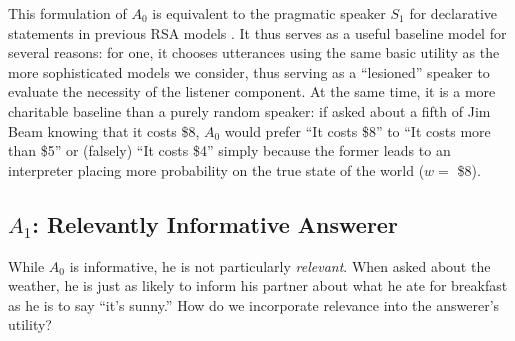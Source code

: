 \documentclass[12pt, floatsintext, jou]{apa6}
\begin{document}
This formulation of $A_0$ is equivalent to the pragmatic speaker $S_1$ for declarative statements in previous RSA models \cite{GoodmanFrank16_RSATiCS}. It thus serves as a useful baseline model for several reasons: for one, it chooses utterances using the same basic utility as the more sophisticated models we consider, thus serving as a ``lesioned'' speaker to evaluate the necessity of the listener component. At the same time, it is a more charitable baseline than a purely random speaker: if asked about a fifth of Jim Beam knowing that it costs \$8, $A_0$ would prefer ``It costs \$8'' to ``It costs more than \$5'' or (falsely) ``It costs \$4'' simply because the former leads to an interpreter placing more probability on the true state of the world ($w = $ \$8).


\subsection{$A_1$: Relevantly Informative Answerer}

While $A_0$ is informative, he is not particularly \emph{relevant}. When asked about the weather, he is just as likely to inform his partner about what he ate for breakfast as he is to say ``it's sunny.'' How do we incorporate relevance into the answerer's utility? 
\end{document}
